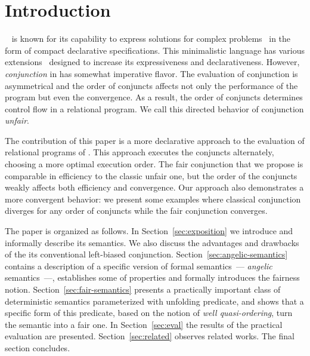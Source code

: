 \section{Introduction}
\label{sec:intro}

\mk~\cite{fair:TheReasonedSchemer,fair:micro} is known for its capability to express solutions for complex problems~\cite{fair:seven,fair:quines,fair:theorem-prover}
in the form of compact declarative specifications. This minimalistic language has various extensions~\cite{fair:CKanren,fair:WillThesis,fair:alphaKanren,fair:Guided} designed to increase its expressiveness and declarativeness. However, \emph{conjunction} in \mk has somewhat imperative flavor. The evaluation of conjunction is asymmetrical
and the order of conjuncts affects not only the performance of the program but even the convergence. As a result, the order of conjuncts determines control flow in
a relational program. We call this directed behavior of conjunction \textit{unfair}.

The contribution of this paper is a more declarative approach to the evaluation of relational programs of \mk. This approach executes the conjuncts alternately, choosing a more optimal execution order.
The fair conjunction that we propose is comparable in efficiency to the classic unfair one, but the order of the conjuncts weakly affects both efficiency and convergence. Our approach also 
demonstrates a more convergent behavior: we present some examples where classical conjunction diverges for any order of conjuncts while the fair conjunction converges.

The paper is organized as follows. In Section~\ref{sec:exposition} we introduce \mk and informally describe its semantics. We also discuss the advantages and drawbacks of the its
conventional left-biased  conjunction. Section~\ref{sec:angelic-semantics} contains a description of a specific version of \mk formal semantics~--- \emph{angelic} semantics~---,
establishes some of properties and formally introduces the fairness notion. Section~\ref{sec:fair-semantics} presents a practically important class of deterministic semantics
parameterized with unfolding predicate, and shows that a specific form of this predicate, based on the notion of \emph{well quasi-ordering}, turn the semantic into a fair one.
In Section~\ref{sec:eval} the results of the practical evaluation are presented. Section~\ref{sec:related} observes related works. The final section concludes.
